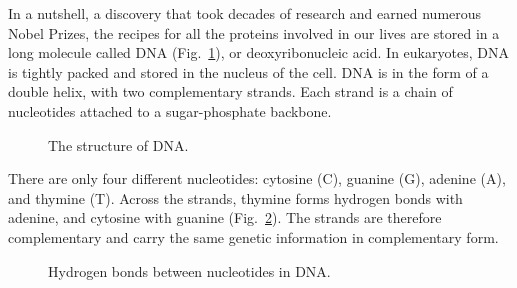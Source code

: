 In a nutshell, a discovery that took decades of research and earned numerous Nobel Prizes, the recipes for all the proteins involved in our lives are stored in a long molecule called DNA (Fig.~\ref{fig:dna-detail}), or deoxyribonucleic acid. In eukaryotes, DNA is tightly packed and stored in the nucleus of the cell. DNA is in the form of a double helix, with two complementary strands. Each strand is a chain of nucleotides attached to a sugar-phosphate backbone.

\begin{figure}
    \caption[6pt]{The structure of DNA.}
    \label{fig:dna-detail}
\end{figure}

There are only four different nucleotides: cytosine (C), guanine (G), adenine (A), and thymine (T). Across the strands, thymine forms hydrogen bonds with adenine, and cytosine with guanine (Fig.~\ref{fig:tacg-bonds}). The strands are therefore complementary and carry the same genetic information in complementary form.

\begin{figure}
    \caption[6pt]{Hydrogen bonds between nucleotides in DNA.}
    \label{fig:tacg-bonds}
\end{figure}

